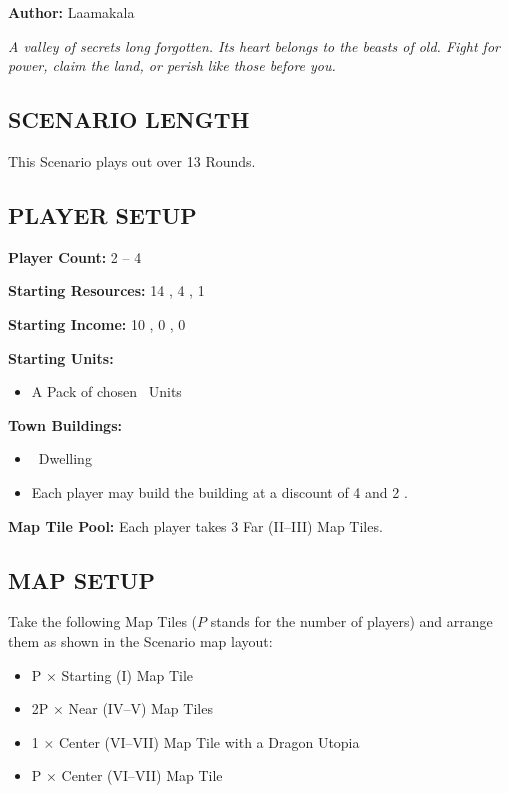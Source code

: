 
\begin{multicols*}{2}

\textbf{Author:} Laamakala

\textit{A valley of secrets long forgotten. Its heart belongs to the beasts of old. Fight for power, claim the land, or perish like those before you.}

\subsection*{\MakeUppercase{Scenario Length}}
This Scenario plays out over 13 Rounds.

\subsection*{\MakeUppercase{Player Setup}}
\textbf{Player Count:} 2 -- 4

\textbf{Starting Resources:} 14 , 4 , 1 

\textbf{Starting Income:} 10 , 0 , 0 

\textbf{Starting Units:}

\begin{itemize}
  \item A Pack of chosen \bronze\ Units
\end{itemize}

\textbf{Town Buildings:}
\begin{itemize}
  \item \bronze\ Dwelling
  \item Each player may build the  building at a discount of 4  and 2 .
\end{itemize}

\textbf{Map Tile Pool:} Each player takes 3 Far (II–III) Map Tiles.

\subsection*{\MakeUppercase{Map Setup}}
Take the following Map Tiles ($P$ stands for the number of players) and arrange them as shown in the Scenario map layout:

\begin{itemize}
  \item P × Starting (I) Map Tile
  \item 2P × Near (IV–V) Map Tiles
  \item 1 × Center (VI–VII) Map Tile with a Dragon Utopia
  \item P × Center (VI–VII) Map Tile
\end{itemize}


\end{multicols*}
